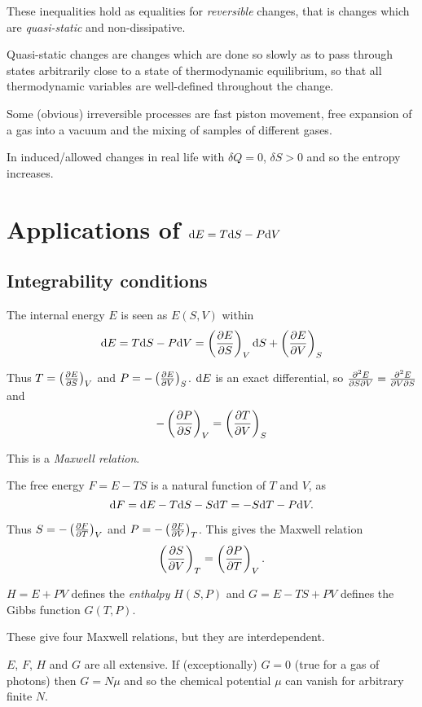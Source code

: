 \documentclass{notes}
\begin{document}
These inequalities hold as equalities for \emph{reversible} changes, that
is changes which are \emph{quasi-static} and non-dissipative.

Quasi-static changes are changes which are done so slowly as to pass
through states arbitrarily close to a state of thermodynamic
equilibrium, so that all thermodynamic variables are well-defined
throughout the change.

Some (obvious) irreversible processes are fast piston movement,
free expansion of a gas into a vacuum and the mixing of samples of
different gases.

In induced/allowed changes in real life with $\delta Q = 0$,
$\delta S > 0$ and so the entropy increases.

\section{Applications of $\mathrm{d} E = T \mathrm{d} S - P \mathrm{d} V$}

\subsection{Integrability conditions}

The internal energy $E$ is seen as $E(S,V)$ within
\[
\mathrm{d} E = T \mathrm{d} S - P \mathrm{d} V
= \left(\frac{\partial E}{\partial S}\right)_V \mathrm{d} S + \left(\frac{\partial E}{\partial V}\right)_S
\]

Thus $T = \left(\frac{\partial E}{\partial S}\right)_V$ and $P = - \left(\frac{\partial E}{\partial V}\right)_S$.
$\mathrm{d} E$ is an exact differential, so $\frac{\partial ^2 E}{\partial S \partial V}
= \frac{\partial ^2 E}{\partial V \partial S}$ and
\[
- \left(\frac{\partial P}{\partial S} \right)_V = \left(\frac{\partial T}{\partial V} \right)_S
\]

This is a \emph{Maxwell relation}.

The free energy $F = E - TS$ is a natural function of $T$ and $V$, as
\[
\mathrm{d} F = \mathrm{d} E - T \mathrm{d} S - S \mathrm{d} T = -S \mathrm{d} T - P \mathrm{d} V.
\]

Thus $S = -\left(\frac{\partial F}{\partial T} \right)_V$ and $P = -\left( \frac{\partial F}{\partial V} \right)_T$.
This gives the Maxwell relation
\[
\left( \frac{\partial S}{\partial V} \right)_T = \left( \frac{\partial P}{\partial T} \right)_V.
\]

$H = E + P V$ defines the \emph{enthalpy} $H(S,P)$ and 
$G = E - T S + P V$ defines the Gibbs function $G(T,P)$.

These give four Maxwell relations, but they are interdependent.

$E$, $F$, $H$ and $G$ are all extensive.  If (exceptionally) $G = 0$
(true for a gas of photons) then $G = N \mu$ and so the chemical potential
$\mu$ can vanish for arbitrary finite $N$.
\end{document}
